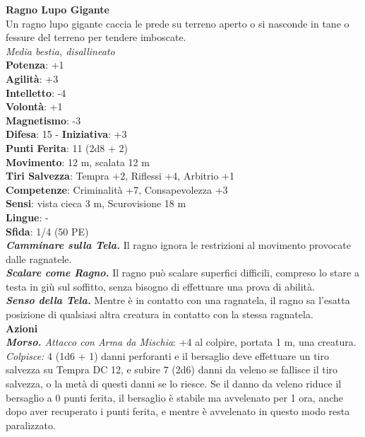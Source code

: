 \begin{multicols}{2}
\medskip\textbf{Ragno Lupo Gigante}\\
Un ragno lupo gigante caccia le prede su terreno aperto o si nasconde in tane o fessure del terreno per tendere imboscate.\\
\emph{Media bestia, disallineato}\\
\textbf{Potenza}: +1\\
\textbf{Agilità}: +3\\
\textbf{Intelletto}: -4\\
\textbf{Volontà}: +1\\
\textbf{Magnetismo}: -3\\
\textbf{Difesa}: 15 - \textbf{Iniziativa}: +3\\
\textbf{Punti Ferita}: 11 (2d8 + 2)\\
\textbf{Movimento}: 12 m, scalata 12 m\\
\textbf{Tiri Salvezza}:  Tempra +2, Riflessi +4, Arbitrio +1 \\
\textbf{Competenze}: Criminalità +7, Consapevolezza +3\\
\textbf{Sensi}: vista cieca 3 m, Scurovisione 18 m\\
\textbf{Lingue}: -\\
\textbf{Sfida}: 1/4 (50 PE)\smallskip\\
\emph{\textbf{Camminare sulla Tela.}} Il ragno ignora le restrizioni al movimento provocate dalle ragnatele.\\
\emph{\textbf{Scalare come Ragno.}} Il ragno può scalare superfici difficili, compreso lo stare a testa in giù sul soffitto, senza bisogno di effettuare una prova di abilità.\\
\emph{\textbf{Senso della Tela.}} Mentre è in contatto con una ragnatela, il ragno sa l'esatta posizione di qualsiasi altra creatura in contatto con la stessa ragnatela.\\
\smallskip\textbf{Azioni}\\
\emph{\textbf{Morso.} Attacco con Arma da Mischia}: +4 al colpire, portata 1 m, una creatura.\\
\emph{Colpisce:} 4 (1d6 + 1) danni perforanti e il bersaglio deve effettuare un tiro salvezza su Tempra DC  12, e subire 7 (2d6) danni da veleno se fallisce il tiro salvezza, o la metà di questi danni se lo riesce. Se il danno da veleno riduce il bersaglio a 0 punti ferita, il bersaglio è stabile ma avvelenato per 1 ora, anche dopo aver recuperato i punti ferita, e mentre è avvelenato in questo modo resta paralizzato.\\


\end{multicols}
